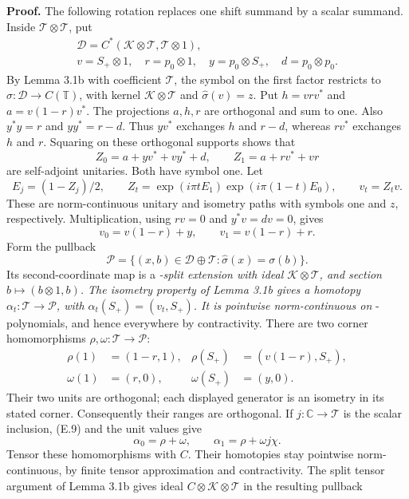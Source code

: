 \documentclass[
  11pt,
]{article}
\begin{document}
\textbf{Proof.} The following rotation replaces one shift summand by a
scalar summand. Inside \(\mathcal T\otimes\mathcal T\), put \[
\begin{gathered}
\mathcal D=C^*(\mathcal K\otimes\mathcal T,\mathcal T\otimes1),\\
v=S_+\otimes1,\quad r=p_0\otimes1,\quad
y=p_0\otimes S_+,\quad d=p_0\otimes p_0.
\end{gathered}
\] By Lemma 3.1b with coefficient \(\mathcal T\), the symbol on the
first factor restricts to \(\widehat\sigma:\mathcal D\to C(\mathbb T)\),
with kernel \(\mathcal K\otimes\mathcal T\) and \(\widehat\sigma(v)=z\).
Put \(h=vrv^*\) and \(a=v(1-r)v^*\). The projections \(a,h,r\) are
orthogonal and sum to one. Also \(y^*y=r\) and \(yy^*=r-d\). Thus
\(yv^*\) exchanges \(h\) and \(r-d\), whereas \(rv^*\) exchanges \(h\)
and \(r\). Squaring on these orthogonal supports shows that \[
Z_0=a+yv^*+vy^*+d,\qquad Z_1=a+rv^*+vr
\tag{E.8}
\] are self-adjoint unitaries. Both have symbol one. Let \[
E_j=(1-Z_j)/2,\qquad
Z_t=\exp(i\pi tE_1)\exp(i\pi(1-t)E_0),\qquad v_t=Z_tv.
\] These are norm-continuous unitary and isometry paths with symbols one
and \(z\), respectively. Multiplication, using \(rv=0\) and
\(y^*v=dv=0\), gives \[
v_0=v(1-r)+y,\qquad v_1=v(1-r)+r.
\tag{E.9}
\] Form the pullback \[
\mathcal P=\{(x,b)\in\mathcal D\oplus\mathcal T:
\widehat\sigma(x)=\sigma(b)\}.
\] Its second-coordinate map is a \emph{-split extension with ideal
\(\mathcal K\otimes\mathcal T\), and section \(b\mapsto(b\otimes1,b)\).
The isometry property of Lemma 3.1b gives a homotopy
\(\alpha_t:\mathcal T\to\mathcal P\), with \(\alpha_t(S_+)=(v_t,S_+)\).
It is pointwise norm-continuous on }-polynomials, and hence everywhere
by contractivity. There are two corner homomorphisms
\(\rho,\omega:\mathcal T\to\mathcal P\): \[
\begin{aligned}
\rho(1)&=(1-r,1),&\rho(S_+)&=(v(1-r),S_+),\\
\omega(1)&=(r,0),&\omega(S_+)&=(y,0).
\end{aligned}
\] Their two units are orthogonal; each displayed generator is an
isometry in its stated corner. Consequently their ranges are orthogonal.
If \(j:\mathbb C\to\mathcal T\) is the scalar inclusion, (E.9) and the
unit values give \[
\alpha_0=\rho+\omega,\qquad \alpha_1=\rho+\omega j\chi.
\tag{E.10}
\] Tensor these homomorphisms with \(C\). Their homotopies stay
pointwise norm-continuous, by finite tensor approximation and
contractivity. The split tensor argument of Lemma 3.1b gives ideal
\(C\otimes\mathcal K\otimes\mathcal T\) in the resulting pullback
\end{document}
